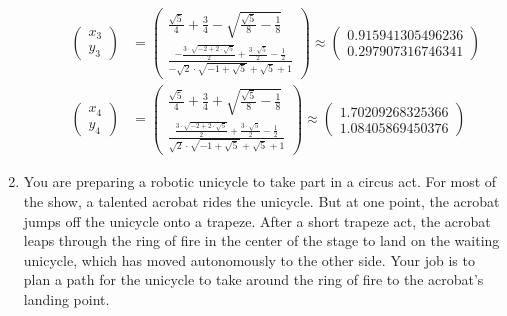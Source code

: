\documentclass[conference,onecolumn]{IEEEtran}
\begin{document}
\begin{enumerate}[label=\arabic{enumi}.]
\begin{enumerate}
\begin{align*}
                        \begin{pmatrix}
                            x_3 \\
                            y_3
                        \end{pmatrix} & = \begin{pmatrix}
                            \frac{\sqrt{5}}{4} + \frac{3}{4} - \sqrt{\frac{\sqrt{5}}{8} - \frac{1}{8}} \\
                            \frac{-\frac{3 \cdot \sqrt{-2 + 2 \cdot \sqrt{5}}}{2} + \frac{3 \cdot \sqrt{5}}{2} - \frac{1}{2}}{-\sqrt{2} \cdot \sqrt{-1 + \sqrt{5}} + \sqrt{5} + 1}
                        \end{pmatrix} \approx
                        \begin{pmatrix}
                            0.915941305496236 \\
                            0.297907316746341
                        \end{pmatrix}                                        \\
                        \begin{pmatrix}
                            x_4 \\
                            y_4
                        \end{pmatrix} & = \begin{pmatrix}
                            \frac{\sqrt{5}}{4} + \frac{3}{4} + \sqrt{\frac{\sqrt{5}}{8} - \frac{1}{8}} \\
                            \frac{\frac{3 \cdot \sqrt{-2 + 2 \cdot \sqrt{5}}}{2} + \frac{3 \cdot \sqrt{5}}{2} - \frac{1}{2}}{\sqrt{2} \cdot \sqrt{-1 + \sqrt{5}} + \sqrt{5} + 1}
                        \end{pmatrix} \approx
                        \begin{pmatrix}
                            1.70209268325366 \\
                            1.08405869450376
                        \end{pmatrix}
                    \end{align*}
          \end{enumerate}

          \clearpage
    \item You are preparing a robotic unicycle to take part in a circus act.
          For most of the show, a talented acrobat rides the unicycle.
          But at one point, the acrobat jumps oﬀ the unicycle onto a trapeze.
          After a short trapeze act, the acrobat leaps through the ring of fire in the center of the stage to land on the waiting unicycle, which has moved autonomously to the other side.
          Your job is to plan a path for the unicycle to take around the ring of ﬁre to the acrobat's landing point.


\end{enumerate}
\end{document}
